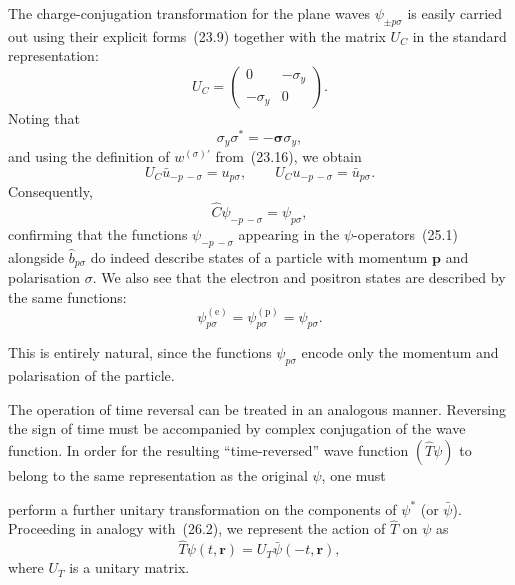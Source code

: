 The charge-conjugation transformation for the plane waves $\psi_{\pm p\sigma}$ is easily carried out using their explicit forms~(23.9) together with the matrix $U_C$ in the standard representation:
\begin{equation}
U_C = \begin{pmatrix} 0 & -\sigma_y\\ -\sigma_y & 0 \end{pmatrix}.
\tag{26.8}
\end{equation}
Noting that
\[
\sigma_y\sigma^* = -\boldsymbol{\sigma}\sigma_y,
\]
and using the definition of $w^{(\sigma)\prime}$ from~(23.16), we obtain
\begin{equation}
U_C\bar u_{-p\,-\sigma} = u_{p\sigma},\qquad U_C u_{-p\,-\sigma} = \bar u_{p\sigma}.
\tag{26.9}
\end{equation}
Consequently,
\begin{equation}
\widehat C\psi_{-p\,-\sigma} = \psi_{p\sigma},
\tag{26.10}
\end{equation}
confirming that the functions $\psi_{-p\,-\sigma}$ appearing in the $\psi$-operators~(25.1) alongside $\widehat b_{p\sigma}$ do indeed describe states of a particle with momentum $\mathbf{p}$ and polarisation $\sigma$. We also see that the electron and positron states are described by the same functions:
\[
\psi^{(\text{e})}_{p\sigma} = \psi^{(\text{p})}_{p\sigma} = \psi_{p\sigma}.
\]

This is entirely natural, since the functions $\psi_{p\sigma}$ encode only the momentum and polarisation of the particle.

The operation of time reversal can be treated in an analogous manner. Reversing the sign of time must be accompanied by complex conjugation of the wave function. In order for the resulting ``time-reversed'' wave function $(\widehat T\psi)$ to belong to the same representation as the original $\psi$, one must

perform a further unitary transformation on the components of $\psi^*$ (or $\bar\psi$). Proceeding in analogy with~(26.2), we represent the action of $\widehat T$ on $\psi$ as
\begin{equation}
\widehat T\psi(t,\mathbf{r}) = U_T\bar\psi(-t,\mathbf{r}),
\tag{26.11}
\end{equation}
where $U_T$ is a unitary matrix.

